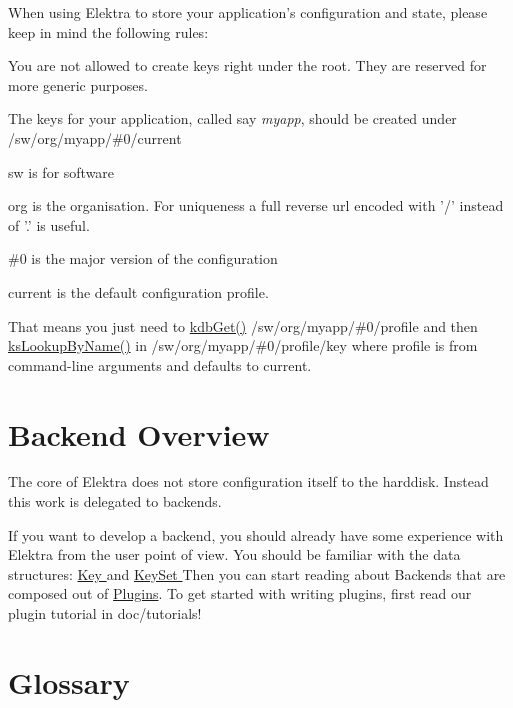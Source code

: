When using Elektra to store your application's configuration and state, please keep in mind the following rules\+:
\begin{DoxyItemize}
\item You are not allowed to create keys right under the root. They are reserved for more generic purposes.
\item The keys for your application, called say {\itshape myapp}, should be created under {\ttfamily /sw/org/myapp/\#0/current} 
\begin{DoxyItemize}
\item sw is for software
\item org is the organisation. For uniqueness a full reverse url encoded with '/' instead of '.' is useful.
\item {\ttfamily \#0} is the major version of the configuration
\item current is the default configuration profile.
\item That means you just need to \hyperlink{group__kdb_ga28e385fd9cb7ccfe0b2f1ed2f62453a1}{kdb\+Get()} {\ttfamily /sw/org/myapp/\#0/profile} and then \hyperlink{group__keyset_gad2e30fb6d4739d917c5abb2ac2f9c1a1}{ks\+Lookup\+By\+Name()} in {\ttfamily /sw/org/myapp/\#0/profile/key} where profile is from command-\/line arguments and defaults to current.
\end{DoxyItemize}
\end{DoxyItemize}\hypertarget{index_backendsoverview}{}\section{Backend Overview}\label{index_backendsoverview}
The core of Elektra does not store configuration itself to the harddisk. Instead this work is delegated to backends.

If you want to develop a backend, you should already have some experience with Elektra from the user point of view. You should be familiar with the data structures\+: \hyperlink{group__key}{Key } and \hyperlink{group__keyset}{Key\+Set } Then you can start reading about Backends that are composed out of \hyperlink{group__plugin}{Plugins}. To get started with writing plugins, first read our plugin tutorial in doc/tutorials!\hypertarget{index_glossary}{}\section{Glossary}\label{index_glossary}

